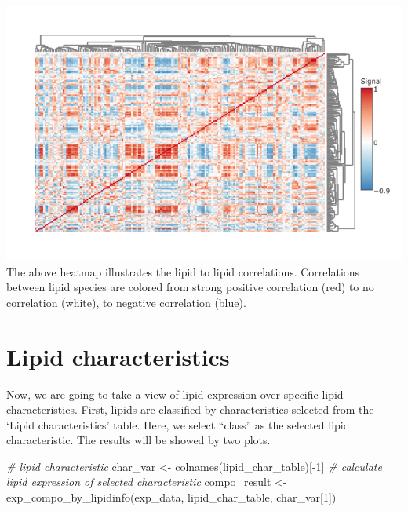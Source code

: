 \documentclass[]{article}
\newcommand{\hlnum}[1]{\textcolor[rgb]{0.816,0.125,0.439}{#1}}%
\newcommand{\hlstr}[1]{\textcolor[rgb]{0.251,0.627,0.251}{#1}}%
\newcommand{\hlcom}[1]{\textcolor[rgb]{0.502,0.502,0.502}{\textit{#1}}}%
\newcommand{\hlopt}[1]{\textcolor[rgb]{0,0,0}{#1}}%
\newcommand{\hlstd}[1]{\textcolor[rgb]{0.251,0.251,0.251}{#1}}%
\newcommand{\hlkwd}[1]{\textcolor[rgb]{0.878,0.439,0.125}{#1}}%
\newenvironment{Shaded}{\begin{myshaded}}{\end{myshaded}}
\newcommand{\KeywordTok}[1]{\hlkwd{#1}}
\newcommand{\DecValTok}[1]{\hlnum{#1}}
\newcommand{\StringTok}[1]{\hlstr{#1}}
\newcommand{\CommentTok}[1]{\hlcom{#1}}
\newcommand{\OperatorTok}[1]{\hlopt{#1}}
\newcommand{\NormalTok}[1]{\hlstd{#1}}
\begin{document}
\includegraphics{./image/corr_heatmap_2.png}
The above heatmap illustrates the lipid to lipid correlations. Correlations between lipid species are colored from strong positive correlation (red) to no correlation (white), to negative correlation (blue).

\hypertarget{subsec:pro-char}{%
\section{Lipid characteristics}\label{subsec:pro-char}}

Now, we are going to take a view of lipid expression over specific lipid characteristics. First, lipids are classified by characteristics selected from the `Lipid characteristics' table. Here, we select ``class'' as the selected lipid characteristic. The results will be showed by two plots.

\begin{Shaded}
\begin{Highlighting}[]
\CommentTok{# lipid characteristic}
\NormalTok{char_var <-}\StringTok{ }\KeywordTok{colnames}\NormalTok{(lipid_char_table)[}\OperatorTok{-}\DecValTok{1}\NormalTok{]}
\CommentTok{# calculate lipid expression of selected characteristic}
\NormalTok{compo_result <-}\StringTok{ }\KeywordTok{exp_compo_by_lipidinfo}\NormalTok{(exp_data, lipid_char_table, char_var[}\DecValTok{1}\NormalTok{])}
\end{Highlighting}
\end{Shaded}

\begin{Shaded}
\end{Shaded}
\end{document}
